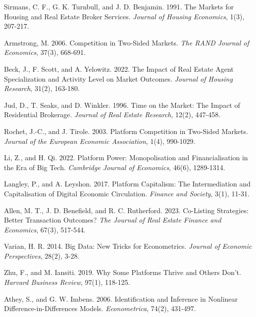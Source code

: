 \documentclass[11pt]{article}
\begin{document}
\begin{singlespace}
\begin{thebibliography}{}
  Sirmans, C. F., G. K. Turnbull, and J. D. Benjamin. 1991. The Markets for Housing and Real Estate Broker Services. \textit{Journal of Housing Economics}, 1(3), 207-217.
  
  Armstrong, M. 2006. Competition in Two-Sided Markets. \textit{The RAND Journal of Economics}, 37(3), 668-691.
  
  Beck, J., F. Scott, and A. Yelowitz. 2022. The Impact of Real Estate Agent Specialization and Activity Level on Market Outcomes. \textit{Journal of Housing Research}, 31(2), 163-180.
  
  Jud, D., T. Seaks, and D. Winkler. 1996. Time on the Market: The Impact of Residential Brokerage. \textit{Journal of Real Estate Research}, 12(2), 447-458.
  
  Rochet, J.-C., and J. Tirole. 2003. Platform Competition in Two-Sided Markets. \textit{Journal of the European Economic Association}, 1(4), 990-1029.
  
  Li, Z., and H. Qi. 2022. Platform Power: Monopolisation and Financialisation in the Era of Big Tech. \textit{Cambridge Journal of Economics}, 46(6), 1289-1314.
  
  Langley, P., and A. Leyshon. 2017. Platform Capitalism: The Intermediation and Capitalisation of Digital Economic Circulation. \textit{Finance and Society}, 3(1), 11-31.
  
  Allen, M. T., J. D. Benefield, and R. C. Rutherford. 2023. Co-Listing Strategies: Better Transaction Outcomes? \textit{The Journal of Real Estate Finance and Economics}, 67(3), 517-544.
  
  Varian, H. R. 2014. Big Data: New Tricks for Econometrics. \textit{Journal of Economic Perspectives}, 28(2), 3-28.
  
  Zhu, F., and M. Iansiti. 2019. Why Some Platforms Thrive and Others Don't. \textit{Harvard Business Review}, 97(1), 118-125.
  
  Athey, S., and G. W. Imbens. 2006. Identification and Inference in Nonlinear Difference-in-Differences Models. \textit{Econometrica}, 74(2), 431-497.%


\end{thebibliography}
\end{singlespace}
\end{document}
